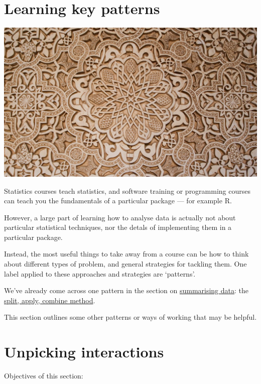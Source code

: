 \documentclass[]{article}
\begin{document}
\hypertarget{learning-key-patterns}{%
\section{Learning key patterns}\label{learning-key-patterns}}

\includegraphics{media/patterns.png}

Statistics courses teach statistics, and software training or programming
courses can teach you the fundamentals of a particular package --- for example
R.

However, a large part of learning how to analyse data is actually not about
particular statistical techniques, nor the detals of implementing them in a
particular package.

Instead, the most useful things to take away from a course can be how to think
about different types of problem, and general strategies for tackling them. One
label applied to these approaches and strategies are `patterns'.

We've already come across one pattern in the section on
\href{summarising-data}{summarising data}: the
\protect\hyperlink{split-apply-combine}{split, apply, combine method}.

This section outlines some other patterns or ways of working that may be
helpful.

\hypertarget{understanding-interactions}{%
\section{Unpicking interactions}\label{understanding-interactions}}

Objectives of this section:
\end{document}
